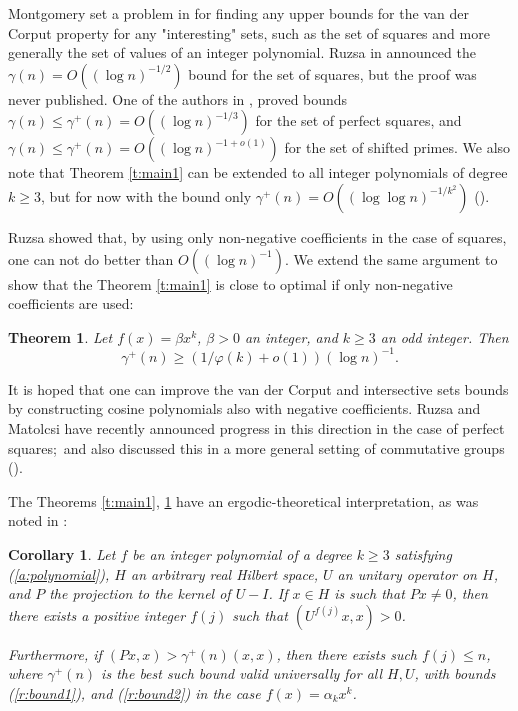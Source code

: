 \documentclass{amsart}
\newtheorem {theorem}{Theorem}
\newtheorem {corollary}{Corollary}
\numberwithin {equation}{section}
\begin{document}
Montgomery set a problem in \cite{Montgomery:94} for finding any upper
bounds for the van der Corput property for any "interesting" sets, such as
the set of squares and more generally the set of values of an integer
polynomial. Ruzsa in \cite{Ruzsa:81} announced the $\gamma (n)=O((\log
n)^{-1/2})$ bound for the set of squares, but the proof was never published.
One of the authors in \cite{Slijepcevic:10}, \cite{Slijepcevic:12} proved
bounds $\gamma (n)\leq \gamma ^{+}(n)=O((\log n)^{-1/3})$ for the set of
perfect squares, and $\gamma (n)\leq \gamma ^{+}(n)=O((\log n)^{-1+o(1)})$
for the set of shifted primes. We also note that Theorem \ref{t:main1} can
be extended to all integer polynomials of degree $k\geq 3$, but for now with
the bound only $\gamma ^{+}(n)=O((\log \log n)^{-1/k^{2}})$ (\cite{Nincevic:12}).

Ruzsa showed that, by using only non-negative coefficients in the case of
squares, one can not do better than $O((\log n)^{-1})$. We extend the same
argument to show that the Theorem \ref{t:main1} is close to optimal if only
non-negative coefficients are used:

\begin{theorem}
\label{t:lower}Let $f(x)=\beta x^{k}$, $\beta >0$ an integer, and $k\geq 3$
an odd integer. Then 
\begin{equation}
\gamma ^{+}(n)\geq (1/\varphi (k)+o(1))(\log n)^{-1}.  \label{r:bound2}
\end{equation}
\end{theorem}

It is hoped that one can improve the van der Corput and intersective sets
bounds by constructing cosine polynomials also with negative coefficients.
Ruzsa and Matolcsi have recently announced progress in this direction in the
case of perfect squares;\ and also discussed this in a more general setting
of commutative groups (\cite{Matolcsi:12a}).

The Theorems \ref{t:main1}, \ref{t:lower} have an ergodic-theoretical
interpretation, as was noted in \cite{Rabar:12}:

\begin{corollary}
Let $f$ be an integer polynomial of a degree $k\geq 3$ satisfying (\ref{a:polynomial}), $H$ an arbitrary real Hilbert space, $U$ an unitary
operator on $H$, and $P$ the projection to the kernel of $U-I$. If $x\in H$
is such that $Px\not=0$, then there exists a positive integer $f(j)$ such
that $(U^{f(j)}x,x)>0$.

Furthermore, if $(Px,x)>\gamma ^{+}(n)(x,x)$, then there exists such $f(j)\leq n$, where $\gamma ^{+}(n)$ is the best such bound valid universally
for all $H,U$, with bounds (\ref{r:bound1}), and (\ref{r:bound2}) in the
case $f(x)=\alpha _kx^{k}$.
\end{corollary}
\end{document}
